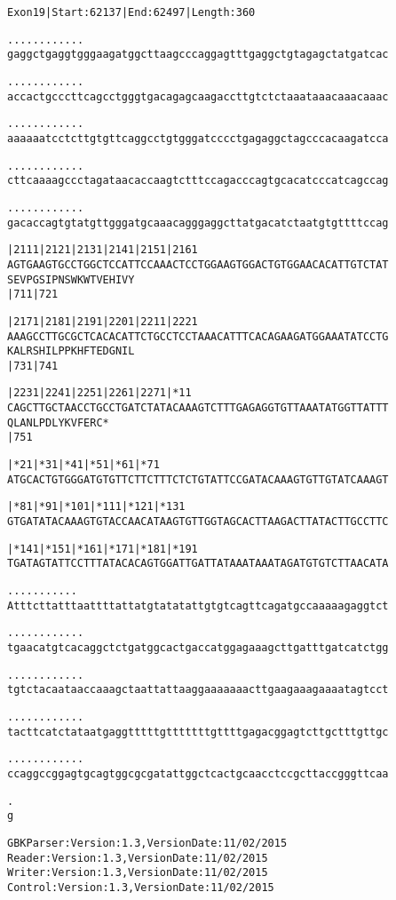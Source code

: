 \documentclass{article}
\begin{document}
\begin{alltt}
Exon 19 | Start: 62137 | End: 62497 | Length: 360

.    .    .    .    .    .    .    .    .    .    .    .    
gaggctgaggtgggaagatggcttaagcccaggagtttgaggctgtagagctatgatcac

.    .    .    .    .    .    .    .    .    .    .    .    
accactgcccttcagcctgggtgacagagcaagaccttgtctctaaataaacaaacaaac

.    .    .    .    .    .    .    .    .    .    .    .    
aaaaaatcctcttgtgttcaggcctgtgggatcccctgagaggctagcccacaagatcca

.    .    .    .    .    .    .    .    .    .    .    .    
cttcaaaagccctagataacaccaagtctttccagacccagtgcacatcccatcagccag

.    .    .    .    .    .    .    .    .    .    .    .    
gacaccagtgtatgttgggatgcaaacagggaggcttatgacatctaatgtgttttccag

       |2111     |2121     |2131     |2141     |2151     |2161
AGTGAAGTGCCTGGCTCCATTCCAAACTCCTGGAAGTGGACTGTGGAACACATTGTCTAT
S  E  V  P  G  S  I  P  N  S  W  K  W  T  V  E  H  I  V  Y  
                           |711                          |721

       |2171     |2181     |2191     |2201     |2211     |2221
AAAGCCTTGCGCTCACACATTCTGCCTCCTAAACATTTCACAGAAGATGGAAATATCCTG
K  A  L  R  S  H  I  L  P  P  K  H  F  T  E  D  G  N  I  L  
                           |731                          |741

       |2231     |2241     |2251     |2261     |2271      |*11
CAGCTTGCTAACCTGCCTGATCTATACAAAGTCTTTGAGAGGTGTTAAATATGGTTATTT
Q  L  A  N  L  P  D  L  Y  K  V  F  E  R  C  *   
                           |751                             

        |*21      |*31      |*41      |*51      |*61      |*71
ATGCACTGTGGGATGTGTTCTTCTTTCTCTGTATTCCGATACAAAGTGTTGTATCAAAGT

        |*81      |*91      |*101     |*111     |*121     |*131
GTGATATACAAAGTGTACCAACATAAGTGTTGGTAGCACTTAAGACTTATACTTGCCTTC

        |*141     |*151     |*161     |*171     |*181     |*191
TGATAGTATTCCTTTATACACAGTGGATTGATTATAAATAAATAGATGTGTCTTAACATA

     .    .    .    .    .    .    .    .    .    .    .    
Atttcttatttaattttattatgtatatattgtgtcagttcagatgccaaaaagaggtct

\end{alltt}
\newpage
\begin{alltt}
.    .    .    .    .    .    .    .    .    .    .    .    
tgaacatgtcacaggctctgatggcactgaccatggagaaagcttgatttgatcatctgg

.    .    .    .    .    .    .    .    .    .    .    .    
tgtctacaataaccaaagctaattattaaggaaaaaaacttgaagaaagaaaatagtcct

.    .    .    .    .    .    .    .    .    .    .    .    
tacttcatctataatgaggtttttgtttttttgttttgagacggagtcttgctttgttgc

.    .    .    .    .    .    .    .    .    .    .    .    
ccaggccggagtgcagtggcgcgatattggctcactgcaacctccgcttaccgggttcaa

.
g
\end{alltt}
\newpage
\begin{alltt}
GBK Parser: Version: 1.3, Version Date: 11/02/2015
Reader: Version: 1.3, Version Date: 11/02/2015
Writer: Version: 1.3, Version Date: 11/02/2015
Control: Version: 1.3, Version Date: 11/02/2015
\end{alltt}
\end{document}
